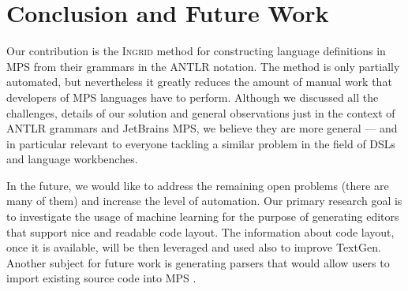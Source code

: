 \section{Conclusion and Future Work}

Our contribution is the \textsc{Ingrid} method for constructing language definitions in MPS from their grammars in the ANTLR notation.
The method is only partially automated, but nevertheless it greatly reduces the amount of manual work that developers of MPS languages have to perform.
Although we discussed all the challenges, details of our solution and general observations just in the context of ANTLR grammars and JetBrains MPS, we believe they are more general --- and in particular relevant to everyone tackling a similar problem in the field of DSLs and language workbenches.

In the future, we would like to address the remaining open problems (there are many of them) and increase the level of automation.
Our primary research goal is to investigate the usage of machine learning for the purpose of generating editors that support nice and readable code layout.
The information about code layout, once it is available, will be then leveraged and used also to improve TextGen.
Another subject for future work is generating parsers that would allow users to import existing source code into MPS .

